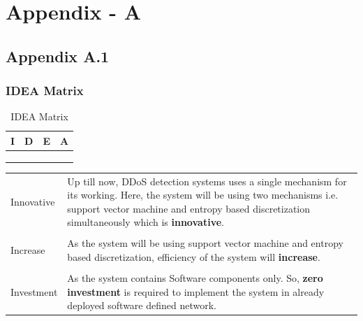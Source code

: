 \documentclass[12pt,a4paper,final]{report}
\DeclareRobustCommand{\gobblefive}[5]{}
\newcommand*{\SkipTocEntry}{\addtocontents{toc}{\gobblefive}}
\begin{document}
\SkipTocEntry\chapter{Appendix - A}
\thispagestyle{empty}
\newpage
\SkipTocEntry\section{Appendix A.1}
\SkipTocEntry\subsection{IDEA Matrix}
\begin{table}[h]
\caption{IDEA Matrix}

\begin{center}
\begin{tabular}{|>{\bf}M{2.5cm}||>{\bf}M{2.5cm}||>{\bf}M{2.5cm}||>{\bf}M{2.5cm}|}
\hline
{}
I & D & E & A \\ \hline
{} &   &  &  \\ \hline
{} &   &  &  \\ \hline
{} &   &  &  \\ \hline
\end{tabular}
\end{center}
\end{table}

\begin{center}
\begin{tabular}{|m{2cm}|m{7cm}|}
\hline
Innovative & Up till now, DDoS detection systems uses a single mechanism for its working. Here, the system will be using two mechanisms i.e. support vector machine and entropy based discretization simultaneously which is \textbf{innovative}. \\

&\\

Increase & As the system will be using support vector machine and entropy based discretization, efficiency of the system will \textbf{increase}. \\

&\\

Investment & As the system contains Software components only. So, \textbf{zero investment} is required to implement the system in already deployed software defined network. \\

\hline
\end{tabular}
\end{center}
\end{document}
